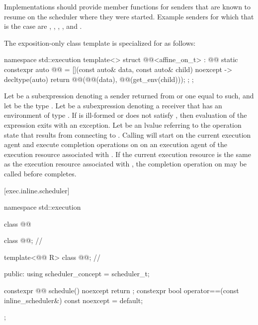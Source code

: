 \pnum
\recommended
Implementations should provide  member functions
for senders that are known to resume on the scheduler where they were started.
Example senders for which that is the case are
,
,
,
, and
.

\pnum
The exposition-only class template 
is specialized for  as follows:

\begin{codeblock}
namespace std::execution {
  template<>
  struct @@<affine_on_t> : @@ {
    static constexpr auto @@ =
      [](const auto& data, const auto& child) noexcept -> decltype(auto) {
        return @@(@@(data), @@(get_env(child)));
      };
  };
}
\end{codeblock}

\pnum
Let  be a subexpression denoting a sender
returned from  or one equal to such,
and let  be the type .
Let  be a subexpression denoting a receiver that
has an environment of type .
If  is ill-formed or
does not satisfy ,
then evaluation of
the expression 
exits with an exception.
Let  be an lvalue referring to the operation state that
results from connecting  to .
Calling  will start  on the current
execution agent and execute completion operations on 
on an execution agent of the execution resource associated with
.
If the current execution resource is the same as the execution
resource associated with , the completion operation on
 may be called before  completes.

[exec.inline.scheduler]{}

\begin{codeblock}
namespace std::execution {
  class @@ {
    class @@;                // \expos

    template<@@ R>
      class @@;               // \expos

  public:
    using scheduler_concept = scheduler_t;

    constexpr @@ schedule() noexcept { return {}; }
    constexpr bool operator==(const inline_scheduler&) const noexcept = default;
  };
}
\end{codeblock}

